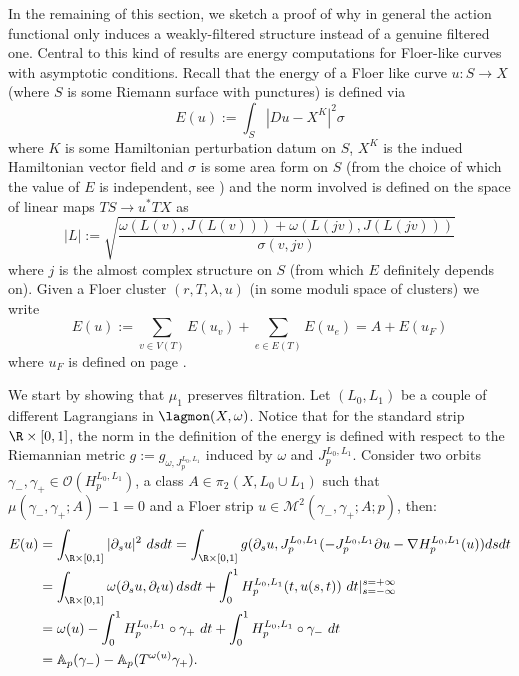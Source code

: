 	\noindent In the remaining of this section, we sketch a proof of why in general the action functional only induces a weakly-filtered structure instead of a genuine filtered one. Central to this kind of results are energy computations for Floer-like curves with asymptotic conditions. Recall that the energy of a Floer like curve $u:S\rightarrow X$ (where $S$ is some Riemann surface with punctures) is defined via $$E(u):= \int_S|Du-X^{K}|^2\sigma$$ where $K$ is some Hamiltonian perturbation datum on $S$, $X^K$ is the indued Hamiltonian vector field and $\sigma$ is some area form on $S$ (from the choice of which the value of $E$ is independent, see \cite{McD-Sa:jhol}) and the norm involved is defined on the space of linear maps $TS\rightarrow u^*TX$ as $$|L|:= \sqrt{\frac{\omega(L(v), J(L(v)))+\omega(L(jv), J(L(jv)))}{\sigma(v,jv)}}$$ where $j$ is the almost complex structure on $S$ (from which $E$ definitely depends on). Given a Floer cluster $(r,T,\lambda,u)$ (in some moduli space of clusters) we write $$E(u):=\sum_{v\in V(T)}E(u_v)+\sum_{e\in E(T)}E(u_e)= A+E(u_F)$$ where $u_F$ is defined on page \pageref{uf}.
	
	We start by showing that $\mu_1$ preserves filtration. Let $(L_0,L_1)$ be a couple of different Lagrangians in $\lagmon(X,\omega)$. Notice that for the standard strip $\R\times [0,1]$, the norm in the definition of the energy is defined with respect to the Riemannian metric $g:=g_{\omega, J^{L_0,L_1}_p}$ induced by $\omega$ and $J^{L_0,L_1}_p$. Consider two orbits $\gamma_-, \gamma_+\in \mathcal{O}(H^{L_0,L_1}_p)$, a class $A\in \pi_2(X,L_0\cup L_1)$ such that $\mu(\gamma_-,\gamma_+;A)-1=0$ and a Floer strip $u\in \mathcal{M}^2(\gamma_-,\gamma_+;A;p)$, then:
	\begin{align*}
		E(u) & = \int_{\R\times [0,1]} |\partial_su|^2 \ dsdt = \int_{\R\times [0,1]} g(\partial_su, J^{L_0,L_1}_p(-J^{L_0,L_1}_p\partial u - \nabla H^{L_0,L_1}_p(u)) dsdt  \\ &= \int_{\R\times [0,1]} \omega(\partial_su, \partial_t u) \, dsdt + \int_0^1H^{L_0,L_1}_p(t,u(s,t))\ dt |_{s=- \infty}^{s=+ \infty} \\ & = \omega(u)-\int_0^1H^{L_0,L_1}_p\circ \gamma_+\ dt + \int_0^1 H^{L_0,L_1}_p\circ \gamma_-\ dt \\
		&= \mathbb{A}_p(\gamma_-)-\mathbb{A}_p(T^{\omega(u)}\gamma_+).
	\end{align*}
	
